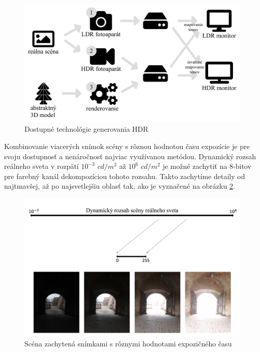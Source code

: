\begin{figure}[t]
    \centering
    \includegraphics[width=\textwidth]{figures/capturing/capturing_technologies}
    \caption{Dostupné technológie generovania HDR}
    \label{fig:pipeline}
\end{figure}

Kombinovanie viacerých snímok scény s rôznou hodnotou času expozície je pre svoju dostupnosť
a nenáročnosť najviac využívanou metódou. Dynamický rozsah reálneho sveta v rozpätí 
$10^{-3}$ $cd/m^{2}$ až $10^{6}$ $cd/m^{2}$ \cite{AHDR} je možné zachytiť na 8-bitov 
pre farebný kanál dekompozíciou tohoto rozsahu. Takto zachytíme detaily od najtmavšej,
až po najsvetlejšiu oblasť tak, ako je vyznačené na obrázku \ref{fig:expo_series}.

\begin{figure}[t]
    \includegraphics[width=\textwidth]{figures/capturing/capturing_series}
    \caption{Scéna zachytená snímkami s rôznymi hodnotami expozičného času}
    \label{fig:expo_series}
\end{figure}

